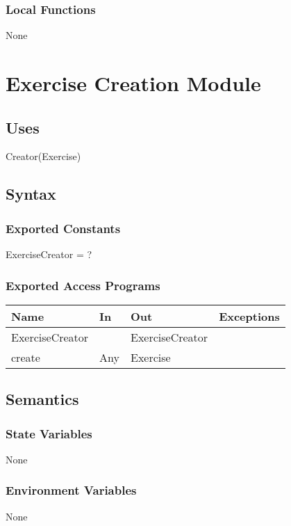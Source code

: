 \documentclass[12pt, titlepage]{article}
\begin{document}
\subsubsection{Local Functions}

None

\newpage
\section{Exercise Creation Module}

\subsection{Uses}

Creator(Exercise)

\subsection{Syntax}

\subsubsection{Exported Constants}

ExerciseCreator = ?

\subsubsection{Exported Access Programs}

\begin{center}
	\begin{tabular}{p{2cm} p{4cm} p{4cm} p{2cm}}
		\hline
		\textbf{Name} & \textbf{In} & \textbf{Out} & \textbf{Exceptions} \\
		\hline
		ExerciseCreator &  & ExerciseCreator &  \\
		create & Any & Exercise &  \\
		\hline
	\end{tabular}
\end{center}

\subsection{Semantics}

\subsubsection{State Variables}
None
\subsubsection{Environment Variables}
None
\end{document}
